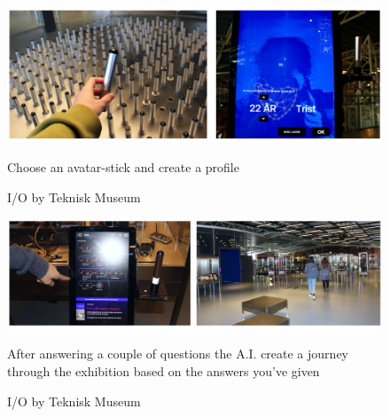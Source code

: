 \begin{figure}[H]
    \centering
    \includegraphics[width=13cm]{pictures/process/tm_pinne.png}
    \caption{I/O by Teknisk Museum}{Choose an avatar-stick and create a profile}
\end{figure}

\begin{figure}[H]
    \centering 
    \includegraphics[width=13cm]{pictures/process/tm_ai.png}
    \caption{I/O by Teknisk Museum}{After answering a couple of questions the A.I. create a journey through the exhibition based on the answers you've given}
\end{figure}